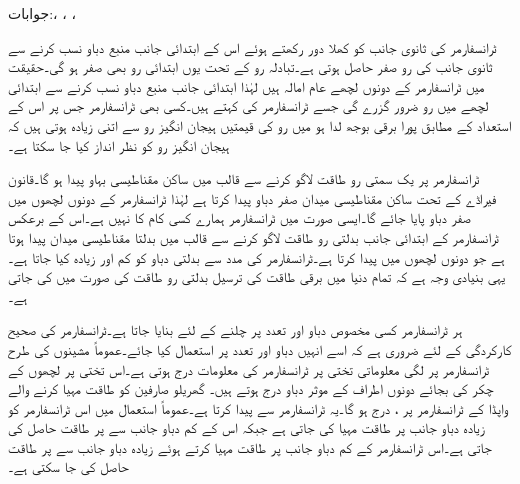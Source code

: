 جوابات:، ، ، 

ٹرانسفارمر کی ثانوی جانب کو کھلا دور رکھتے ہوئے اس کے ابتدائی جانب منبع دباو نسب کرنے سے ثانوی جانب کی رو صفر حاصل ہوتی ہے۔تبادلہ رو کے تحت یوں ابتدائی رو بھی صفر ہو گی۔حقیقت میں ٹرانسفارمر کے دونوں لچھے عام امالہ ہیں لہٰذا ابتدائی جانب منبع دباو نسب کرنے سے ابتدائی لچھے میں رو ضرور گزرے گی جسے ٹرانسفارمر کی  کہتے ہیں۔کسی بھی ٹرانسفارمر جس پر اس کے استعداد کے مطابق پورا برقی بوجھ لدا ہو میں رو کی قیمتیں  ہیجان انگیز رو سے اتنی زیادہ ہوتی ہیں کہ ہیجان انگیز رو کو نظر انداز کیا جا سکتا ہے۔

ٹرانسفارمر پر یک سمتی رو طاقت لاگو کرنے سے قالب میں ساکن مقناطیسی بہاو پیدا ہو گا۔قانون فیراڈے کے تحت ساکن مقناطیسی میدان صفر دباو پیدا کرتا ہے لہٰذا ٹرانسفارمر کے دونوں لچھوں میں صفر دباو پایا جائے گا۔ایسی صورت میں ٹرانسفارمر ہمارے کسی کام کا نہیں ہے۔اس کے برعکس ٹرانسفارمر کے ابتدائی جانب بدلتی رو طاقت لاگو کرنے سے قالب میں بدلتا مقناطیسی میدان پیدا ہوتا ہے جو دونوں لچھوں میں   پیدا کرتا ہے۔ٹرانسفارمر کی مدد سے بدلتی دباو کو کم اور زیادہ کیا جاتا ہے۔یہی بنیادی وجہ ہے کہ تمام دنیا میں برقی طاقت کی ترسیل بدلتی رو طاقت کی صورت میں کی جاتی ہے۔

ہر ٹرانسفارمر کسی مخصوص دباو اور تعدد پر چلنے کے لئے بنایا جاتا ہے۔ٹرانسفارمر کی صحیح کارکردگی کے لئے ضروری ہے کہ اسے انہیں دباو اور تعدد پر استعمال کیا جائے۔عموماً مشینوں کی طرح ٹرانسفارمر پر لگی معلوماتی تختی پر ٹرانسفارمر کی معلومات درج ہوتی ہے۔اس تختی پر لچھوں کے چکر کی بجائے دونوں اطراف کے موثر دباو درج ہوتے ہیں۔ گھریلو صارفین کو طاقت مہیا کرنے والے واپڈا کے ٹرانسفارمر پر ،  درج ہو گا۔یہ ٹرانسفارمر  سے  پیدا کرتا ہے۔عموماً استعمال میں اس ٹرانسفارمر کو زیادہ دباو جانب  پر طاقت مہیا کی جاتی ہے  جبکہ اس کے کم دباو جانب سے  پر طاقت حاصل کی جاتی ہے۔اس ٹرانسفارمر کے کم دباو جانب  پر طاقت مہیا کرتے ہوئے زیادہ دباو جانب سے  پر طاقت حاصل کی جا سکتی ہے۔

